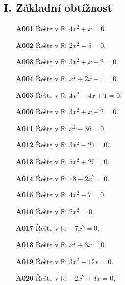 \documentclass[11pt,a4paper]{article}
\begin{document}
\subsection*{I. Základní obtížnost}
\begin{enumerate}[label={},itemsep=5pt]
\item[\textbf{A001}] Řešte v $\mathbb R$: $4x^{2} + x=0$. 
\item[\textbf{A002}] Řešte v $\mathbb R$: $2x^{2} - 5=0$. 
\item[\textbf{A003}] Řešte v $\mathbb R$: $3x^{2} + x - 2=0$. 
\item[\textbf{A004}] Řešte v $\mathbb R$: $x^{2} + 2x - 1=0$. 
\item[\textbf{A005}] Řešte v $\mathbb R$: $4x^{2} - 4x + 1=0$. 
\item[\textbf{A006}] Řešte v $\mathbb R$: $3x^{2} + x + 2=0$. 
\item[\textbf{A011}] Řešte v $\mathbb R$: $x^{2} - 36=0$.
\item[\textbf{A012}] Řešte v $\mathbb R$: $3x^{2} - 27=0$.
\item[\textbf{A013}] Řešte v $\mathbb R$: $5x^{2} + 20=0$.
\item[\textbf{A014}] Řešte v $\mathbb R$: $18 - 2x^{2}=0$.
\item[\textbf{A015}] Řešte v $\mathbb R$: $4x^{2} - 7=0$.
\item[\textbf{A016}] Řešte v $\mathbb R$: $2x^{2}=0$.
\item[\textbf{A017}] Řešte v $\mathbb R$: $- 7x^{2}=0$.
\item[\textbf{A018}] Řešte v $\mathbb R$: $x^{2} + 3x=0$.
\item[\textbf{A019}] Řešte v $\mathbb R$: $3x^{2} - 12x=0$.
\item[\textbf{A020}] Řešte v $\mathbb R$: $- 2x^{2} + 8x=0$.
\end{enumerate}
\end{document}
